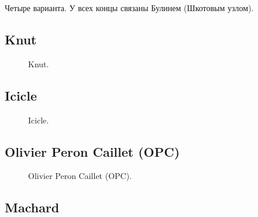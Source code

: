 Четыре варианта. У всех концы связаны Булинем (Шкотовым узлом).

\subsection{Knut}

\begin{figure}[H]\centering
	\begin{minipage}{1\linewidth}
		\begin{center}
			\tcbox[enhanced jigsaw,colframe=black,opacityframe=0.5,opacityback=0.5]
			{\centering{}}
		\end{center}
	\end{minipage}
\caption{Knut.}
\label{ris:Knut}
\end{figure}

\subsection{Icicle}

\begin{figure}[H]\centering
	\begin{minipage}{1\linewidth}
		\begin{center}
			\tcbox[enhanced jigsaw,colframe=black,opacityframe=0.5,opacityback=0.5]
			{\centering{}}
		\end{center}
	\end{minipage}
\caption{Icicle.}
\label{ris:Icicle}
\end{figure}

\subsection{Olivier Peron Caillet (OPC)}

\begin{figure}[H]\centering
	\begin{minipage}{1\linewidth}
		\begin{center}
			\tcbox[enhanced jigsaw,colframe=black,opacityframe=0.5,opacityback=0.5]
			{\centering{}}
		\end{center}
	\end{minipage}
\caption{Olivier Peron Caillet (OPC).}
\label{ris:OPC}
\end{figure}

\subsection{Machard}

